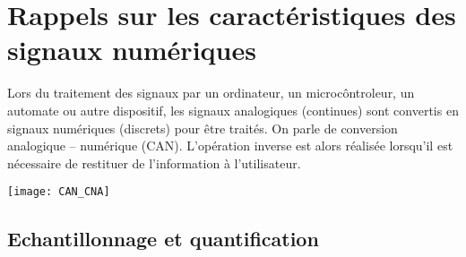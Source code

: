 \def\xxactivite{Cours}
\def\xxauteur{\textsl{Xavier Pessoles}}

\fichefalse \proftrue \tdfalse \courstrue

\def\xxnumchapitre{Chapitre 2 \vspace{.2cm}}
\def\xxchapitre{\hspace{.12cm} Correction numérique des systèmes asservis}

\def\xxcompetences{%
\textsl{%
\textbf{Savoirs et compétences :}\\
}}


\def\xxfigures{
}%




\setlength{\columnseprule}{.1pt}

\vspace{2cm}
\pagestyle{fancy}
\thispagestyle{plain}


\section{Rappels sur les caractéristiques des signaux numériques}
Lors du traitement des signaux par un ordinateur, un microcôntroleur, un automate ou autre dispositif, les signaux analogiques (continues) sont convertis en signaux numériques (discrets) pour être traités. On parle de conversion analogique -- numérique (CAN). 
L'opération inverse est alors réalisée lorsqu'il est nécessaire de restituer de l'information à l'utilisateur.
\begin{center}
\texttt{[image: CAN\_CNA]}
\end{center}

\subsection{Echantillonnage et quantification}

